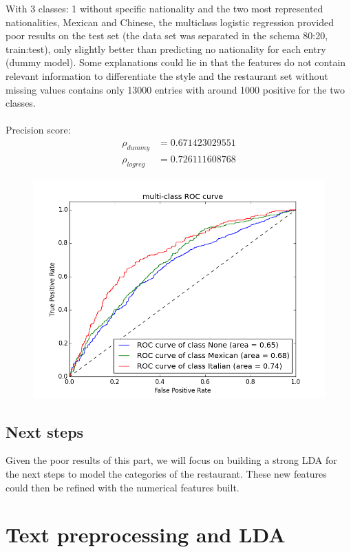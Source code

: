 \documentclass[paper=a4, fontsize=11pt]{scrartcl} %
\numberwithin{equation}{section}
\numberwithin{figure}{section}
\numberwithin{table}{section}
\begin{document}
With 3 classes: 1 without specific nationality and the two most represented nationalities, Mexican and Chinese, the multiclass logistic regression provided poor results on the test set (the data set was separated in the schema 80:20, train:test), only slightly better than predicting no nationality for each entry (dummy model). Some explanations could lie in that the features do not contain relevant information to differentiate the style and the restaurant set without missing values contains only 13000 entries with around 1000 positive for the two classes.\\\\
Precision score:
\begin{align*}
	\rho_{dummy} & = 0.671423029551 \\
	\rho_{logreg} &  = 0.726111608768 
\end{align*}

\begin{figure}[H]
	\includegraphics[scale=0.35]{ROC.png}
	\centering
\end{figure}

\subsection{Next steps}

Given the poor results of this part, we will focus on building a strong LDA for the next steps to model the categories of the restaurant. These new features could then be refined with the numerical features built.

\section{Text preprocessing and LDA}
\end{document}
